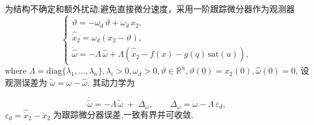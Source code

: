 \documentclass[pdflatex,sn-mathphys-num]{sn-jnl}%
\theoremstyle{thmstyleone}%
\theoremstyle{thmstyletwo}%
\theoremstyle{thmstylethree}%
\begin{document}






为结构不确定和额外扰动,避免直接微分速度，采用一阶跟踪微分器作为观测器
\begin{equation}
	\begin{cases}
\dot\vartheta =-\omega_d\,\vartheta+\omega_d\,x_2,  \\
\hat{\dot x}_2=\omega_d(x_2-\vartheta),   \\
\dot{\hat \omega}= -\Lambda\,\hat \omega
+\Lambda\left(\hat{\dot x}_2 - f(x) -g(q)\,\mathrm{sat}(u) \right),
\end{cases}
\end{equation}
where $\Lambda=\mathrm{diag}\{\lambda_{1},...,\lambda_{n}\}, \lambda_{i}>0, \omega_d>0, \vartheta \in \mathbb{R}^n, \vartheta(0)=x_2(0), \hat \omega(0)=0$,
设观测误差为 $\tilde \omega=\omega-\hat\omega$. 其动力学为

\begin{equation}\label{eq:omega-tilde}
\dot{\tilde\omega}
= -\Lambda\,\tilde\omega\;+\;\Delta_\omega,\qquad
\Delta_\omega=\dot\omega-\Lambda\,\varepsilon_d,
\end{equation}
$\varepsilon_d=\hat{\dot x}_2-\dot x_2$ 为跟踪微分器误差,一致有界并可收敛.
\end{document}
